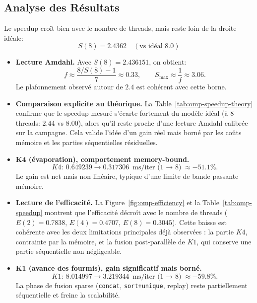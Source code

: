 \subsection{Analyse des Résultats}

Le speedup croît bien avec le nombre de threads, mais reste loin de la droite idéale:
\[
S(8)=2.4362 \quad (\text{vs idéal } 8.0)
\]

\begin{itemize}[leftmargin=*]
  \item \textbf{Lecture Amdahl.} Avec \(S(8)=2.436151\), on obtient:
  \[
  f \approx \frac{8/S(8)-1}{7}\approx 0.33,\qquad S_{\max}\approx \frac{1}{f}\approx 3.06.
  \]
  Le plafonnement observé autour de \(2.4\) est cohérent avec cette borne.
\end{itemize}

\begin{itemize}[leftmargin=*]
  \item \textbf{Comparaison explicite au théorique.}
  La Table~\ref{tab:omp-speedup-theory} confirme que le speedup mesuré s'écarte fortement du
  modèle idéal (à 8 threads: \(2.44\) vs \(8.00\)), alors qu'il reste proche d'une lecture
  Amdahl calibrée sur la campagne. Cela valide l'idée d'un gain réel mais borné par les coûts
  mémoire et les parties séquentielles résiduelles.
\end{itemize}

\begin{itemize}[leftmargin=*]
  \item \textbf{K4 (évaporation), comportement memory-bound.}
  \[
  K4:\ 0.649239 \rightarrow 0.317306\ \text{ms/iter (1 $\to$ 8)} \approx -51.1\%.
  \]
  Le gain est net mais non linéaire, typique d'une limite de bande passante mémoire.
\end{itemize}

\begin{itemize}[leftmargin=*]
  \item \textbf{Lecture de l'efficacité.}
  La Figure~\ref{fig:omp-efficiency} et la Table~\ref{tab:omp-speedup} montrent que l'efficacité
  décroît avec le nombre de threads (\(E(2)=0.7838\), \(E(4)=0.4707\), \(E(8)=0.3045\)).
  Cette baisse est cohérente avec les deux limitations principales déjà observées :
  la partie \(K4\), contrainte par la mémoire, et la fusion post-parallèle de \(K1\), qui conserve
  une partie séquentielle non négligeable.
\end{itemize}

\begin{itemize}[leftmargin=*]
  \item \textbf{K1 (avance des fourmis), gain significatif mais borné.}
  \[
  K1:\ 8.014997 \rightarrow 3.219344\ \text{ms/iter (1 $\to$ 8)} \approx -59.8\%.
  \]
  La phase de fusion sparse (\texttt{concat}, \texttt{sort+unique}, replay) reste partiellement
  séquentielle et freine la scalabilité.
\end{itemize}

